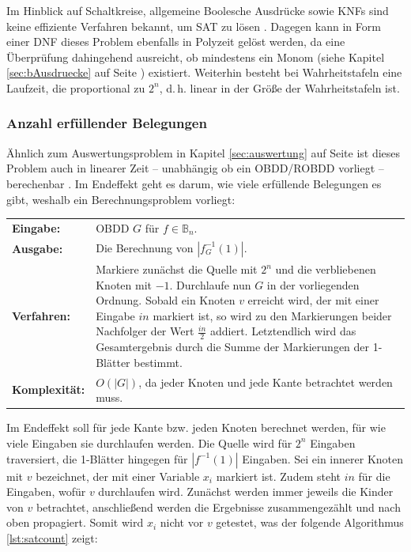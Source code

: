 Im Hinblick auf Schaltkreise, allgemeine Boolesche Ausdrücke sowie KNFs sind keine effiziente Verfahren bekannt, um SAT zu lösen \cite{m2007}. Dagegen kann in Form einer DNF dieses Problem ebenfalls in Polyzeit gelöst werden, da eine Überprüfung dahingehend ausreicht, ob mindestens ein Monom (siehe Kapitel \ref{sec:bAusdruecke} auf Seite \pageref{sec:bAusdruecke}) existiert. Weiterhin besteht bei Wahrheitstafeln eine Laufzeit, die proportional zu $2^n$, d.\,h. linear in der Größe der Wahrheitstafeln ist.

\subsubsection{Anzahl erfüllender Belegungen}
\label{sec:erfuellbarkeitAnzahl}
Ähnlich zum Auswertungsproblem in Kapitel \ref{sec:auswertung} auf Seite \pageref{sec:auswertung} ist dieses Problem auch in linearer Zeit -- unabhängig ob ein OBDD/ROBDD vorliegt -- berechenbar \cite[S.37-38]{s2007}. Im Endeffekt geht es darum, wie viele erfüllende Belegungen es gibt, weshalb ein Berechnungsproblem vorliegt:\\
\begin{tabular}{l|p{12cm}}
	\textbf{Eingabe:} & OBDD $G$ für $f \in \mathbb{B}_n$. \\ 
	\textbf{Ausgabe:} & Die Berechnung von $|f_{G}^{-1}(1)|$.\\ 
	\textbf{Verfahren:} & Markiere zunächst die Quelle mit $2^n$ und die verbliebenen Knoten mit $-1$. Durchlaufe nun $G$ in der vorliegenden Ordnung. Sobald ein Knoten $v$ erreicht wird, der mit einer Eingabe $in$ markiert ist, so wird zu den Markierungen beider Nachfolger der Wert $\frac{in}{2}$ addiert. Letztendlich wird das Gesamtergebnis durch die Summe der Markierungen der 1-Blätter bestimmt. \\
	\textbf{Komplexität:} & $O(|G|)$, da jeder Knoten und jede Kante betrachtet werden muss.
\end{tabular}
Im Endeffekt soll für jede Kante bzw. jeden Knoten berechnet werden, für wie viele Eingaben sie durchlaufen werden. Die Quelle wird für $2^n$ Eingaben traversiert, die 1-Blätter hingegen für $|f^{-1}(1)|$ Eingaben. Sei ein innerer Knoten mit $v$ bezeichnet, der mit einer Variable $x_i$ markiert ist. Zudem steht $in$ für die Eingaben, wofür $v$ durchlaufen wird. Zunächst werden immer jeweils die \glqq Kinder\grqq{} von $v$ betrachtet, anschließend werden die Ergebnisse zusammengezählt und nach oben propagiert. Somit wird $x_i$ nicht vor $v$ getestet, was der folgende Algorithmus \ref{lst:satcount} zeigt:
